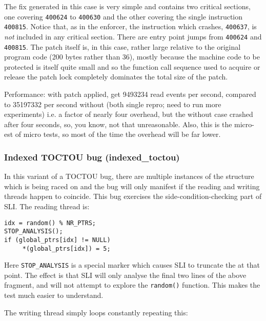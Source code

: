 
The fix generated in this case is very simple and contains two
critical sections, one covering \verb|400624| to \verb|400630| and the
other covering the single instruction \verb|400815|.  Notice that, as
in the enforcer, the instruction which crashes, \verb|400637|, is
\emph{not} included in any critical section.  There are entry point
jumps from \verb|400624| and \verb|400815|.  The patch itself is, in
this case, rather large relative to the original program code (200
bytes rather than 36), mostly because the machine code to be protected
is itself quite small and so the function call sequence used to
acquire or release the patch lock completely dominates the total size
of the patch.

Performance: with patch applied, get 9493234 read events per second,
compared to 35197332 per second without (both single repro; need to
run more experiments) i.e. a factor of nearly four overhead, but the
without case crashed after four seconds, so, you know, not that
unreasonable.  Also, this is the micro-est of micro tests, so most of
the time the overhead will be far lower.

\subsubsection{Indexed TOCTOU bug (indexed\_toctou)}

In this variant of a TOCTOU bug, there are multiple instances of the
structure which is being raced on and the bug will only manifest if
the reading and writing threads happen to coincide.  This bug
exercises the side-condition-checking part of SLI.  The reading thread
is:

\begin{verbatim}
idx = random() % NR_PTRS;
STOP_ANALYSIS();
if (global_ptrs[idx] != NULL)
     *(global_ptrs[idx]) = 5;
\end{verbatim}

Here \verb|STOP_ANALYSIS| is a special marker which causes SLI to
truncate the \StateMachine at that point.  The effect is that SLI will
only analyse the final two lines of the above fragment, and will not
attempt to explore the \verb|random()| function.  This makes the test
much easier to understand.


The writing thread simply loops constantly repeating this:

